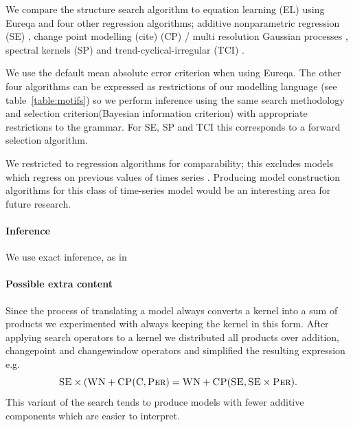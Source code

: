 \documentclass{article}
\def\eg{e.g.\ }
\begin{document}
We compare the structure search algorithm to equation learning (EL) using Eureqa \citep{Eureqa} and four other regression algorithms; additive nonparametric regression (SE) \citep[e.g.][]{buja1989linear}, change point modelling (cite) (CP) / multi resolution Gaussian processes \citep[e.g.][]{garnett2010sequential, FoxDunson:NIPS2012}, spectral kernels (SP) \citep{WilAda13} and trend-cyclical-irregular (TCI) \citep[e.g.][]{lind2006basic}.

We use the default mean absolute error criterion when using Eureqa.
The other four algorithms can be expressed as restrictions of our modelling language (see table~\ref{table:motifs}) so we perform inference using the same search methodology and selection criterion\footnotemark (Bayesian information criterion) with appropriate restrictions to the grammar.
For SE, SP and TCI this corresponds to a forward selection algorithm.

We restricted to regression algorithms for comparability; this excludes models which regress on previous values of times series \citep[e.g.][]{box2013time}.
Producing model construction algorithms for this class of time-series model would be an interesting area for future research.

\paragraph{Inference}

We use exact inference, as in \cite{DuvLloGroetal13}

\paragraph{Possible extra content}


Since the process of translating a model always converts a kernel into a sum of products we experimented with always keeping the kernel in this form.
After applying search operators to a kernel we distributed all products over addition, changepoint and changewindow operators and simplified the resulting expression \eg
\begin{equation}
{\textsc{SE}} \times ({\textsc{WN}} + {\textsc{CP}}({\textsc{C}}, {\textsc{Per}}) = {\textsc{WN}} + {\textsc{CP}}({\textsc{SE}}, {\textsc{SE}} \times {\textsc{Per}}).
\end{equation}
This variant of the search tends to produce models with fewer additive components which are easier to interpret.
\end{document}
